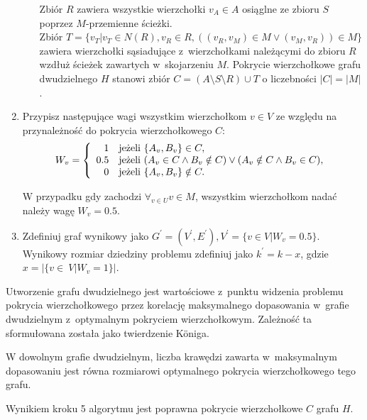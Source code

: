 \begin{enumerate}
\begin{itemize}
        Zbiór $R$ zawiera wszystkie wierzchołki $v_A \in A$ osiąglne ze zbioru $S$ poprzez $M$-przemienne ścieżki. \\
        Zbiór $T=\{v_T|v_T \in N(R), v_R \in R, ((v_R,v_M) \in M \lor (v_M,v_R)) \in M\}$ zawiera wierzchołki sąsiadujące z~wierzchołkami należącymi do zbioru $R$ wzdłuż ścieżek zawartych w~skojarzeniu $M$.
        Pokrycie wierzchołkowe grafu dwudzielnego $H$ stanowi zbiór $C=(A \setminus S \setminus R) \cup T$ o liczebności $|C|=|M|$.
    \end{itemize}
  \item Przypisz następujące wagi wszystkim wierzchołkom $v \in V$ ze względu na przynależność do pokrycia wierzchołkowego $C$:
    \begin{equation*}
    W_v = \left\{
    \begin{array}{rl}
    1 & \textnormal{jeżeli } \{A_v, B_v\} \in C,\\
    0.5 & \textnormal{jeżeli } (A_v \in C \land B_v \notin C) \lor (A_v \notin C \land B_v \in C),\\
    0 & \textnormal{jeżeli } \{A_v, B_v\} \notin C.
    \end{array} \right.
    \end{equation*}

    W przypadku gdy zachodzi $\forall_{v \in U}{v \in M}$, wszystkim wierzchołkom nadać należy wagę $W_v=0.5$.
  \item Zdefiniuj graf wynikowy jako 
    $G^\prime=(V^\prime, E^\prime), V^\prime=\{v \in V|W_v=0.5\}$.
    Wynikowy rozmiar dziedziny problemu zdefiniuj jako 
    $k^\prime=k-x$, gdzie $x=|\{v\in~V|W_v=1\}|$.
\end{enumerate}
Utworzenie grafu dwudzielnego jest wartościowe z~punktu widzenia problemu
pokrycia wierzchołkowego przez korelację maksymalnego dopasowania w~grafie
dwudzielnym z~optymalnym pokryciem wierzchołkowym. 
Zależność ta sformułowana została jako twierdzenie K\"oniga.
\begin{theorem}
  W dowolnym grafie dwudzielnym, liczba krawędzi zawarta w~maksymalnym
  dopasowaniu jest równa rozmiarowi optymalnego pokrycia wierzchołkowego tego
  grafu.
\end{theorem}
\begin{theorem}\label{theorem_nf1}
  Wynikiem kroku 5 algorytmu jest poprawna pokrycie wierzchołkowe $C$ grafu $H$.
\end{theorem}
